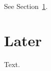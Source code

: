 \documentclass{article}
\begin{document}
See Section~\ref{sec:later}.
\section{Later}\label{sec:later}
Text.
\end{document}
